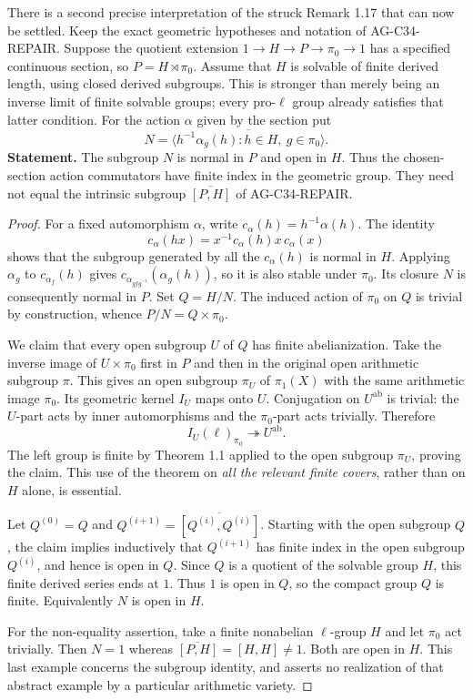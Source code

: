 There is a second precise interpretation of the struck Remark 1.17 that
can now be settled. Keep the exact geometric hypotheses and notation of
AG-C34-REPAIR. Suppose the quotient extension
$1\to H\to P\to\pi_0\to1$ has a specified continuous section, so
$P=H\rtimes\pi_0$. Assume that $H$ is solvable of finite derived
length, using closed derived subgroups. This is stronger than merely
being an inverse limit of finite solvable groups; every pro-$\ell$
group already satisfies that latter condition. For the action $\alpha$
given by the section put
\[
 N=\overline{\langle h^{-1}\alpha_g(h):h\in H,
                                      \ g\in\pi_0\rangle}.
\]
\textbf{Statement.} The subgroup $N$ is normal in $P$ and open in
$H$. Thus the chosen-section action commutators have finite index in
the geometric group. They need not equal the intrinsic subgroup
$\overline{[P,H]}$ of AG-C34-REPAIR.

\begin{proof}
For a fixed automorphism $\alpha$, write
$c_\alpha(h)=h^{-1}\alpha(h)$. The identity
\[
 c_\alpha(hx)=x^{-1}c_\alpha(h)x\,c_\alpha(x)
\]
shows that the subgroup generated by all the $c_\alpha(h)$ is normal
in $H$. Applying $\alpha_g$ to $c_{\alpha_f}(h)$ gives
$c_{\alpha_{gfg^{-1}}}(\alpha_g(h))$, so it is also stable under
$\pi_0$. Its closure $N$ is consequently normal in $P$. Set
$Q=H/N$. The induced action of $\pi_0$ on $Q$ is trivial by
construction, whence $P/N=Q\times\pi_0$.

We claim that every open subgroup $U$ of $Q$ has finite abelianization.
Take the inverse image of $U\times\pi_0$ first in $P$ and then in
the original open arithmetic subgroup $\pi$. This gives an open
subgroup $\pi_U$ of $\pi_1(X)$ with the same arithmetic image
$\pi_0$. Its geometric kernel $I_U$ maps onto $U$. Conjugation on
$U^{\mathrm{ab}}$ is trivial: the $U$-part acts by inner
automorphisms and the $\pi_0$-part acts trivially. Therefore
\[
 I_U(\ell)_{\pi_0}\twoheadrightarrow U^{\mathrm{ab}}.
\]
The left group is finite by Theorem 1.1 applied to the open subgroup
$\pi_U$, proving the claim. This use of the theorem on \emph{all
the relevant finite covers}, rather than on $H$ alone, is essential.

Let $Q^{(0)}=Q$ and
$Q^{(i+1)}=\overline{[Q^{(i)},Q^{(i)}]}$. Starting with the open
subgroup $Q$, the claim implies inductively that $Q^{(i+1)}$ has
finite index in the open subgroup $Q^{(i)}$, and hence is open in
$Q$. Since $Q$ is a quotient of the solvable group $H$, this finite
derived series ends at $1$. Thus $1$ is open in $Q$, so the compact
group $Q$ is finite. Equivalently $N$ is open in $H$.

For the non-equality assertion, take a finite nonabelian $\ell$-group
$H$ and let $\pi_0$ act trivially. Then $N=1$ whereas
$\overline{[P,H]}=[H,H]\ne1$. Both are open in $H$. This last
example concerns the subgroup identity, and asserts no realization of
that abstract example by a particular arithmetic variety.
\end{proof}

